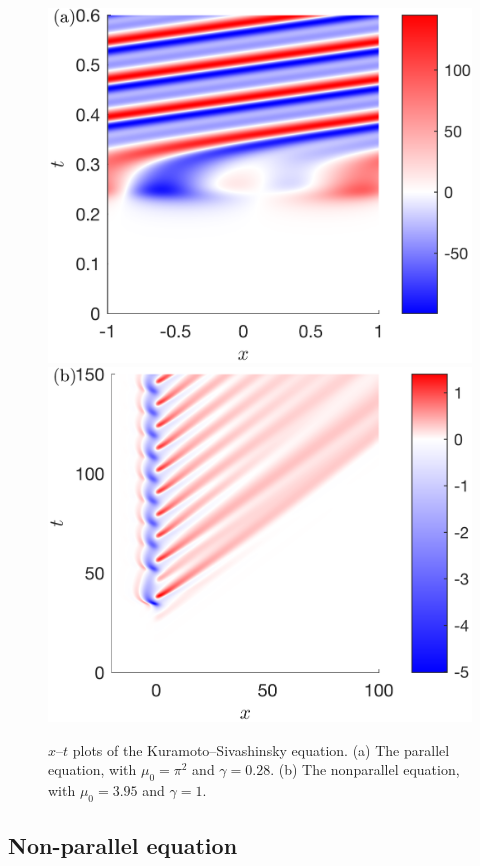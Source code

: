 \documentclass[11pt]{article}
\newcommand{\KSE}{Kuramoto--Sivashinsky equation}
\begin{document}
\begin{figure}
    \centering
    \includegraphics{xt_parallel}
    \hfill
    \includegraphics{xt_nonparallel}

    \caption{%
        $x$--$t$ plots of the \KSE.
        (a) The parallel equation, with $\mu_0 = \pi^2$ and $\gamma = 0.28$.
        (b) The nonparallel equation, with $\mu_0 = 3.95$ and $\gamma = 1$.%
    }
    \label{fig:time-resolved}
\end{figure}

\subsection{Non-parallel equation}
\end{document}
